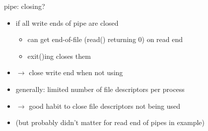\begin{frame}{pipe: closing?}
    \begin{itemize}
    \item if all write ends of pipe are closed
        \begin{itemize}
        \item can get end-of-file (read() returning 0) on read end
        \item exit()ing closes them
        \end{itemize}
    \item $\rightarrow$ close write end when not using
    \vspace{.5cm}
    \item generally: limited number of file descriptors per process
    \item $\rightarrow$ good habit to close file descriptors not being used
    \item (but probably didn't matter for read end of pipes in example)
    \end{itemize}
\end{frame}
